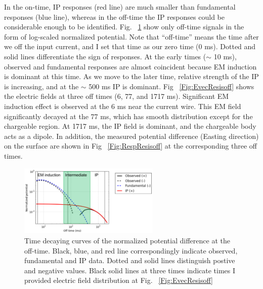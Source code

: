 \documentclass[letterpaper,11pt]{article}
\begin{document}
In the on-time, IP responses (red line) are much smaller than fundamental responses (blue line), whereas in the off-time the IP responses could be considerable enough to be identified. Fig. ~\ref{Fig:DecayOffResis} show only off-time signals in the form of log-scaled normalized potential. Note that ``off-time'' means the time after we off the input current, and I set that time as our zero time (0 ms). Dotted and solid lines differentiate the sign of responses. At the early times ($\sim$ 10 ms), observed and fundamental responses are almost coincident because EM induction is dominant at this time. As we move to the later time, relative strength of the IP is increasing, and at the $\sim$ 500 ms IP is dominant. Fig ~\ref{Fig:EvecResisoff} shows the electric fields at three off times (6, 77, and 1717 ms). Significant EM induction effect is observed at the 6 ms near the current wire. This EM field significantly decayed at the 77 ms, which has smooth distribution except for the chargeable region. At 1717 ms, the IP field is dominant, and the chargeable body acts as a dipole. 
In addition, the measured potential difference (Easting direction) on the surface are shown in Fig ~\ref{Fig:RespResisoff} at the corresponding three off times. 

\begin{figure}[htb]
  \centering
  \includegraphics[width=0.6\textwidth]{figures/DecayOffResis.png}
  \caption{Time decaying curves of the normalized potential difference at the off-time. Black, blue, and red line correspondingly indicate observed, fundamental and IP data. Dotted and solid lines distinguish postive and negative values. Black solid lines at three times indicate times I provided electric field distribution at Fig. ~\ref{Fig:EvecResisoff}}
  \label{Fig:DecayOffResis}
\end{figure}
\end{document}

